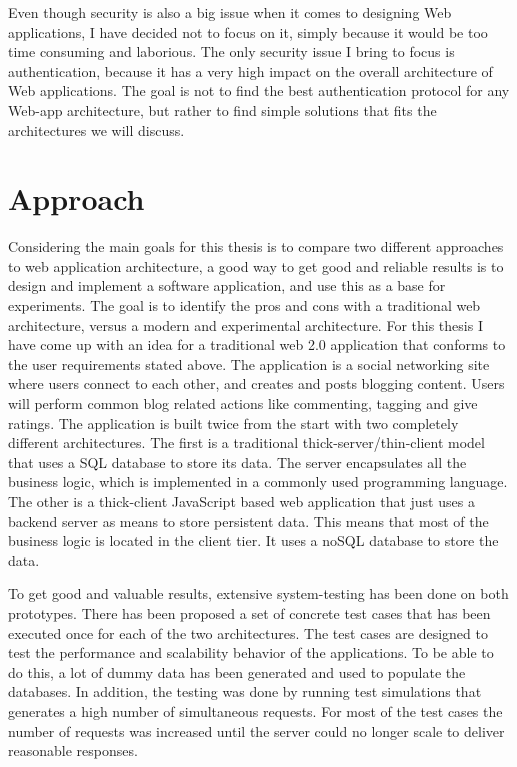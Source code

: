 Even though security is also a big issue when it comes to designing Web applications, I have decided not to focus on it, simply because it would be too time consuming and laborious. The only security issue I bring to focus is authentication, because it has a very high impact on the overall architecture of Web applications. The goal is not to find the best authentication protocol for any Web-app architecture, but rather to find simple solutions that fits the architectures we will discuss. 


\section{Approach}
Considering the main goals for this thesis is to compare two different approaches to web application architecture, a good way to get good and reliable results is to design and implement a software application, and use this as a base for experiments. The goal is to identify the pros and cons with a traditional web architecture, versus a modern and experimental architecture. For this thesis I have come up with an idea for a traditional web 2.0 application that conforms to the user requirements stated above. The application is a social networking site where users connect to each other, and creates and posts blogging content. Users will perform common blog related actions like commenting, tagging and give ratings. The application is built twice from the start with two completely different architectures. The first is a traditional thick-server/thin-client model that uses a SQL database to store its data. The server encapsulates all the business logic, which is  implemented in a commonly used programming language. The other is a thick-client JavaScript based web application that just uses a backend server as means to store persistent data. This means that most of the business logic is located in the client tier. It uses a noSQL database to store the data.

To get good and valuable results, extensive system-testing has been done on both prototypes. There has been proposed a set of concrete test cases that has been executed once for each of the two architectures. The test cases are designed to test the performance and scalability behavior of the applications. To be able to do this, a lot of dummy data has been generated and used to populate the databases. In addition, the testing was done by running test simulations that generates a high number of simultaneous requests. For most of the test cases the number of requests was increased until the server could no longer scale to deliver reasonable responses. 

